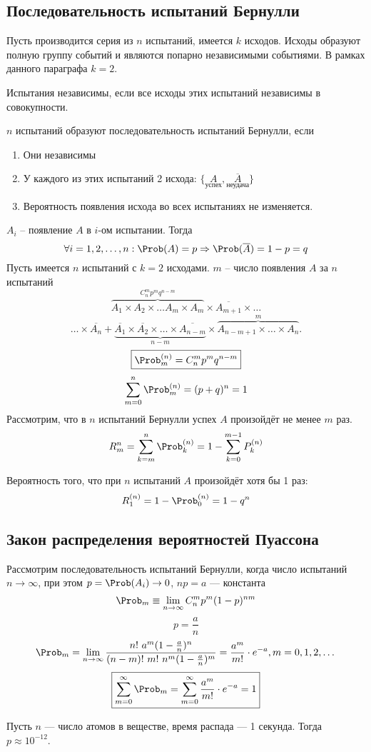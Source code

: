 \subsection{Последовательность испытаний Бернулли}
Пусть производится серия из $n$ испытаний, имеется $k$ исходов. Исходы образуют полную группу событий и являются попарно независимыми событиями. В рамках данного параграфа $k = 2$.
\begin{definition}
	Испытания независимы, если все исходы этих испытаний независимы в совокупности.
\end{definition}
\begin{definition}
	$n$ испытаний образуют последовательность испытаний Бернулли, если
	\begin{enumerate}
		\item Они независимы
		\item У каждого из этих испытаний 2 исхода: $\{\underset{\text{успех}}{A}, \underset{\text{неудача}}{\overline{A}} \}$
		\item Вероятность появления исхода во всех испытаниях не изменяется.
	\end{enumerate}
\end{definition}
$A_i$ -- появление $A$ в $i$-ом испытании. Тогда
\[ \forall i=\To n : \Prob(A) = p \Rightarrow \Prob(\overline{A}) = 1 - p = q \]
Пусть имеется $n$ испытаний с $k=2$ исходами. $m$ -- число появления $A$ за $n$ испытаний
\[ \overbrace{A_1 \times A_2 \times \dots A_m \times A_m}^{C_n^m p^m q^{n-m}} \times \overline{A_{m+1}} \times \dots \]
\[ \ldots \times \overline{A_n} + \underbrace{\overline{A_1} \times \overline{A_2} \times \dots \times \overline{A_{n-m}}}_{n-m} \times \overbrace{A_{n-m+1} \times \ldots \times A_n}^m.\]
\[
	\boxed{\Prob_m^{(n)} = C_n^m p^m q^{n-m}}
\]
\[
	\sum\limits_{m=0}^n \Prob_m^{(n)} = (p + q)^n = 1
\]
Рассмотрим, что в $n$ испытаний Бернулли успех $A$ произойдёт не менее $m$ раз.
\[
	R_m^{n} = \sum\limits_{k = m}^n \Prob_k^{(n)} = 1 - \sum\limits_{k=0}^{m-1} P_k^{(n)}
\]
\begin{example}
	Вероятность того, что при $n$ испытаний $A$ произойдёт хотя бы 1 раз:
	\[ R_1^{(n)} = 1 - \Prob_0^{(n)} = 1 - q^n \]
\end{example}
\subsection{Закон распределения вероятностей Пуассона}
Рассмотрим последовательность испытаний Бернулли, когда число испытаний $n \to \infty$, при этом $p = \Prob(A_i) \to 0$, $np = a$ --- константа
\[
	\Prob_m \equiv \lim_{n \to \infty} C_n^m p^m (1-p)^{nm}
\]
\[ p = \frac{a}{n} \]
\[ \Prob_m = \lim_{n \to \infty} \frac{n!\ a^m (1 - \frac{a}{n})^n}{(n-m)!\ m!\ n^m (1 - \frac{a}{n})^m} = \frac{a^m}{m!} \cdot e^{-a}, m = 0, 1, 2, \dots \]
\[ \boxed{\sum\limits_{m=0}^\infty \Prob_m = \sum\limits_{m=0}^\infty \frac{a^m}{m!} \cdot e^{-a} = 1}\]
\begin{example}
	Пусть $n$ --- число атомов в веществе, время распада --- 1 секунда. Тогда $p \approx 10^{-12}$.
\end{example}


